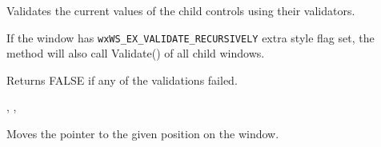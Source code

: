 Validates the current values of the child controls using their validators.

If the window has {\tt wxWS\_EX\_VALIDATE\_RECURSIVELY} extra style flag set,
the method will also call Validate() of all child windows.


Returns FALSE if any of the validations failed.


,\rtfsp
{},\rtfsp
{}

\label{wxwindowwarppointer}


Moves the pointer to the given position on the window.




